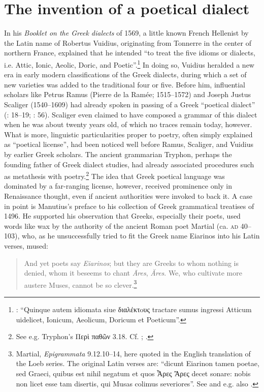 {\section{The invention of a poetical dialect}\label{sec:2.7}

In his \textit{Booklet on the Greek dialects} of 1569, a little known French Hellenist by the Latin name of Robertus Vuidius, originating from Tonnerre in the center of northern France, explained that he intended “to treat the five idioms or dialects, i.e. Attic, Ionic, Aeolic, Doric, and Poetic”.\footnote{\citet[137\textsc{\textsuperscript{v}}]{Vuidius1569}: “Quinque autem idiomata siue διαλέκτoυς tractare sumus ingressi Atticum uidelicet, Ionicum, Aeolicum, Doricum et Poeticum”.} In doing so, Vuidius heralded a new era in early modern classifications of the Greek dialects, during which a set of new varieties was added to the traditional four or five. Before him, influential scholars like Petrus Ramus (Pierre de la Ramée; 1515–1572) and Joseph Justus Scaliger (1540–1609) had already spoken in passing of a Greek “poetical dialect” (\citealt{Ramus1560}: 18–19; \citealt{Scaliger1594}: 56). Scaliger even claimed to have composed a grammar of this dialect when he was about twenty years old, of which no traces remain today, however. What is more, linguistic particularities proper to poetry, often simply explained as “poetical license”, had been noticed well before Ramus, Scaliger, and Vuidius by earlier Greek scholars. The ancient grammarian Tryphon, perhaps the founding father of Greek dialect studies, had already associated procedures such as metathesis with poetry.\footnote{See e.g. Tryphon’s Περὶ παθῶν 3.18. Cf. \citet[78\textsc{\textsuperscript{v}}]{Da1509}; \citet[209, 230, 235]{Vergara1537}.} The idea that Greek poetical language was dominated by a far-ranging license, however, received prominence only in Renaissance thought, even if ancient authorities were invoked to back it. A case in point is Manutius’s preface to his collection of Greek grammatical treatises of 1496. He supported his observation that Greeks, especially their poets, used words like wax by the authority of the ancient Roman poet Martial (ca. \textsc{ad} 40–103), who, as he unsuccessfully tried to fit the Greek name Eiarinos into his Latin verses, mused:

\begin{quote}
And yet poets say \textit{Eiarinos}; {\textbar} but they are Greeks to whom nothing is denied, {\textbar} whom it beseems to chant \textit{Āres}, \textit{Ăres}. {\textbar} We, who cultivate more austere Muses, {\textbar} cannot be so clever.\footnote{Martial, \textit{Epigrammata} 9.12.10–14, here quoted in the English translation of the Loeb series. The original Latin verses are: “dicunt Eiarinon tamen poetae, {\textbar} sed Graeci, quibus est nihil negatum {\textbar} et quos Ἆρες Ἄρες decet sonare: {\textbar} nobis non licet esse tam disertis, {\textbar} qui Musas colimus severiores”. See \citet[*.ii\textsc{\textsuperscript{v}}]{Manutius1496} and e.g. also \citet[187 \textsc{\textsuperscript{r}}]{Enoch1555}.}
\end{quote}

}
